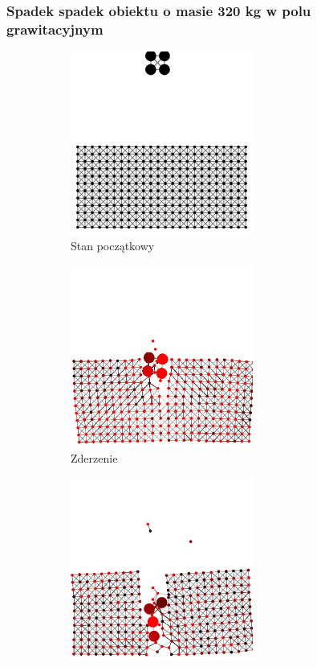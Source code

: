 \documentclass[12pt, letterpaper]{report}
\begin{document}
    \subsubsection{Spadek spadek obiektu o masie 320 kg w polu grawitacyjnym}
    \begin{figure}[h]

        \begin{subfigure}{0.5\textwidth}
            \centering
            \includegraphics[width=6cm, height=6cm]{collision_2x2_24x12_mass80_1} 
            \caption{Stan początkowy}
        \end{subfigure}
        \begin{subfigure}{0.5\textwidth}
            \centering
            \includegraphics[width=6cm, height=6cm]{collision_2x2_24x12_mass80_2}
            \caption{Zderzenie}
        \end{subfigure}
        \begin{subfigure}{0.5\textwidth}
            \centering
            \includegraphics[width=6cm, height=6cm]{collision_2x2_24x12_mass80_3}

\end{subfigure}
\end{figure}
\end{document}
